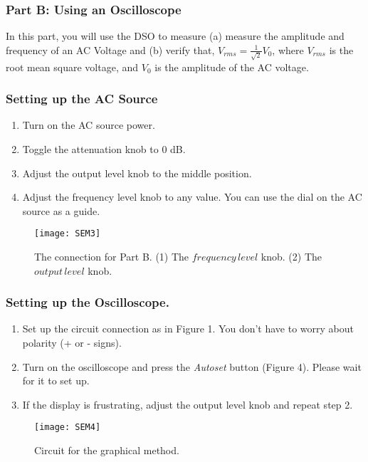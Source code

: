 \documentclass[twocolumn,a4paper,11pt]{article}
\begin{document}
\hfill

\newpage
\subsubsection*{Part B: Using an Oscilloscope}

In this part, you will use the DSO to measure (a) measure the amplitude and frequency of an AC Voltage and (b) verify that, \( V_{rms} = \frac{1}{\sqrt{2}}V_0 \), where \( V_{rms} \) is the root mean square voltage, and \( V_0 \) is the amplitude of the AC voltage.

\subsubsection*{Setting up the AC Source}
\begin{enumerate}
    \item Turn on the AC source power.
    \item Toggle the attenuation knob to 0 dB.
    \item Adjust the output level knob to the middle position.
    \item Adjust the frequency level knob to any value. You can use the dial on the AC source as a guide.
\end{enumerate}

\begin{figure}[htbp]
\centering
\texttt{[image: SEM3]}
\caption{The connection for Part B. (1) The $frequency\,level$ knob. (2) The $output\,level$ knob.}
\label{6}
\end{figure}
\subsubsection*{Setting up the Oscilloscope.}
\begin{enumerate}
    \item Set up the circuit connection as in Figure 1. You don't have to worry about polarity (+ or - signs).
    \item Turn on the oscilloscope and press the \textit{Autoset} button (Figure 4). Please wait for it to set up.
    \item If the display is frustrating, adjust the output level knob and repeat step 2.
\end{enumerate}

\begin{figure}[htbp]
\centering
\texttt{[image: SEM4]}
\caption{Circuit for the graphical method.}
\label{6}
\end{figure}
\end{document}
